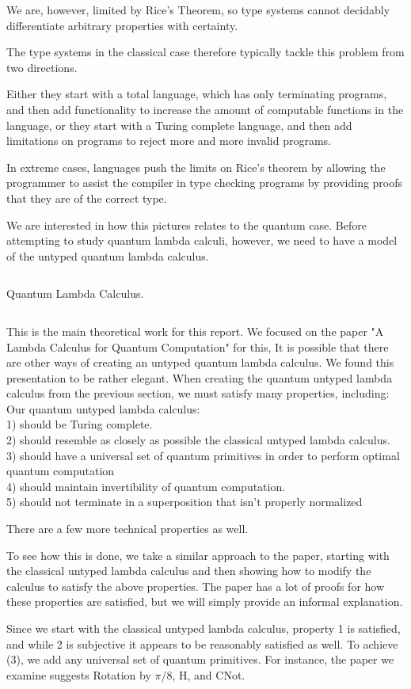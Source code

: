 \documentclass{article}
\theoremstyle{plain}
\theoremstyle{definition}
\theoremstyle{remark}
\begin{document}
We are, however, limited by Rice's Theorem, so type systems cannot decidably differentiate arbitrary properties with certainty.

The type systems in the classical case therefore typically tackle this problem from two directions.

Either they start with a total language, which has only terminating programs, and then add functionality to increase the amount of computable functions in the language, or they start with a Turing complete language, and then add limitations on programs to reject more and more invalid programs.

In extreme cases, languages push the limits on Rice's theorem by allowing the programmer to assist the compiler in type checking programs by providing proofs that they are of the correct type.


We are interested in how this pictures relates to the quantum case.
Before attempting to study quantum lambda calculi, however, we need to have a model of the untyped quantum lambda calculus.

$$$$

Quantum Lambda Calculus.

$$$$

This is the main theoretical work for this report.
We focused on the paper "A Lambda Calculus for Quantum Computation" for this,
It is possible that there are other ways of creating an untyped quantum lambda calculus.
We found this presentation to be rather elegant.
When creating the quantum untyped lambda calculus from the previous section, we must satisfy many properties, including:
$$$$
Our quantum untyped lambda calculus:
$$$$
1) should be Turing complete.$$$$
2) should resemble as closely as possible the classical untyped lambda calculus.$$$$
3) should have a universal set of quantum primitives in order to perform optimal quantum computation$$$$
4) should maintain invertibility of quantum computation.$$$$
5) should not terminate in a superposition that isn't properly normalized$$$$
$$$$

There are a few more technical properties as well.


To see how this is done, we take a similar approach to the paper, starting with the classical untyped lambda calculus and then showing how to modify the calculus to satisfy the above properties.
The paper has a lot of proofs for how these properties are satisfied, but we will simply provide an informal explanation.


Since we start with the classical untyped lambda calculus, property 1 is satisfied, and while 2 is subjective it appears to be reasonably satisfied as well.
To achieve (3), we add any universal set of quantum primitives. For instance, the paper we examine suggests Rotation by $\pi/8$, H, and CNot.
\end{document}
